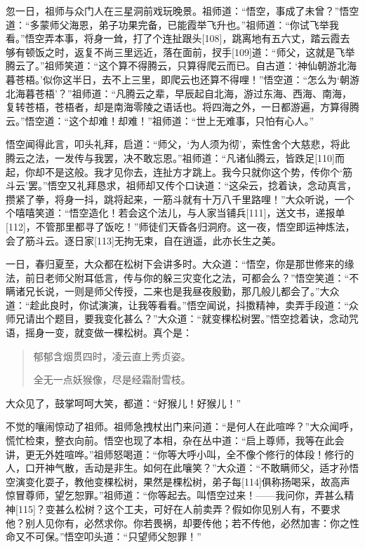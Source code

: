 \documentclass[12pt,UTF8]{ctexbook}
\begin{document}
忽一日，祖师与众门人在三星洞前戏玩晚景。祖师道：“悟空，事成了未曾？”悟空道：“多蒙师父海恩，弟子功果完备，已能霞举飞升也。”祖师道：“你试飞举我看。”悟空弄本事，将身一耸，打了个连扯跟头[108]，跳离地有五六丈，踏云霞去够有顿饭之时，返复不尚三里远近，落在面前，扠手[109]道：“师父，这就是飞举腾云了。”祖师笑道：“这个算不得腾云，只算得爬云而已。自古道：‘神仙朝游北海暮苍梧。’似你这半日，去不上三里，即爬云也还算不得哩！”悟空道：“怎么为‘朝游北海暮苍梧’？”祖师道：“凡腾云之辈，早辰起自北海，游过东海、西海、南海，复转苍梧，苍梧者，却是南海零陵之语话也。将四海之外，一日都游遍，方算得腾云。”悟空道：“这个却难！却难！”祖师道：“世上无难事，只怕有心人。”

悟空闻得此言，叩头礼拜，启道：“师父，‘为人须为彻’，索性舍个大慈悲，将此腾云之法，一发传与我罢，决不敢忘恩。”祖师道：“凡诸仙腾云，皆跌足[110]而起，你却不是这般。我才见你去，连扯方才跳上。我今只就你这个势，传你个‘筋斗云’罢。”悟空又礼拜恳求，祖师却又传个口诀道：“这朵云，捻着诀，念动真言，攒紧了拳，将身一抖，跳将起来，一筋斗就有十万八千里路哩！”大众听说，一个个嘻嘻笑道：“悟空造化！若会这个法儿，与人家当铺兵[111]，送文书，递报单[112]，不管那里都寻了饭吃！”师徒们天昏各归洞府。这一夜，悟空即运神炼法，会了筋斗云。逐日家[113]无拘无束，自在逍遥，此亦长生之美。

一日，春归夏至，大众都在松树下会讲多时。大众道：“悟空，你是那世修来的缘法，前日老师父附耳低言，传与你的躲三灾变化之法，可都会么？”悟空笑道：“不瞒诸兄长说，一则是师父传授，二来也是我昼夜殷勤，那几般儿都会了。”大众道：“趁此良时，你试演演，让我等看看。”悟空闻说，抖擞精神，卖弄手段道：“众师兄请出个题目，要我变化甚么？”大众道：“就变棵松树罢。”悟空捻着诀，念动咒语，摇身一变，就变做一棵松树。真个是：
\begin{quotation}
郁郁含烟贯四时，凌云直上秀贞姿。

全无一点妖猴像，尽是经霜耐雪枝。
\end{quotation}
大众见了，鼓掌呵呵大笑，都道：“好猴儿！好猴儿！”

不觉的嚷闹惊动了祖师。祖师急拽杖出门来问道：“是何人在此喧哗？”大众闻呼，慌忙检束，整衣向前。悟空也现了本相，杂在丛中道：“启上尊师，我等在此会讲，更无外姓喧哗。”祖师怒喝道：“你等大呼小叫，全不像个修行的体段！修行的人，口开神气散，舌动是非生。如何在此嚷笑？”大众道：“不敢瞒师父，适才孙悟空演变化耍子，教他变棵松树，果然是棵松树，弟子每[114]俱称扬喝采，故高声惊冒尊师，望乞恕罪。”祖师道：“你等起去。叫悟空过来！——我问你，弄甚么精神[115]？变甚么松树？这个工夫，可好在人前卖弄？假如你见别人有，不要求他？别人见你有，必然求你。你若畏祸，却要传他；若不传他，必然加害：你之性命又不可保。”悟空叩头道：“只望师父恕罪！”
\end{document}
